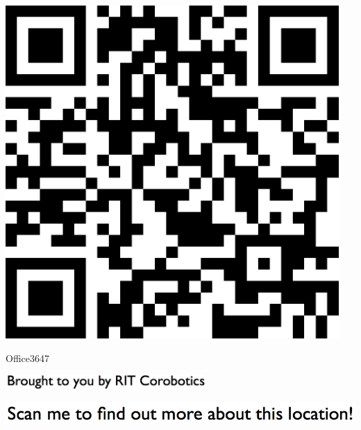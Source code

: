 \documentclass[letterpaper]{article}
\begin{document}
 \begingroup 
 \centerline{\includegraphics[scale=1,width=5in,height=5in]{Office3647.png}} 
 \endgroup 
 \vspace*{\fill} 

 \hfill{\small Office3647} 

  \vspace{0.7in} 
 
 \centerline{\includegraphics[scale=1,width=3in]{text-bottom.png}} 
 
 \pagebreak 
{} 
 \vspace*{\fill} 
 
  \centerline{\includegraphics[scale=1,width=6in]{text-top.png}} 
 
 \vspace{0.5in} 
 
\end{document}
